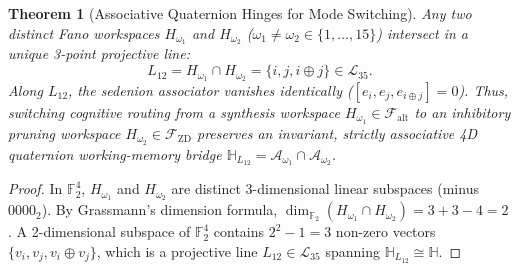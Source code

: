 \documentclass[11pt,a4paper]{article}
\newtheorem{theorem}{Theorem}[section]
\theoremstyle{definition}
\theoremstyle{remark}
\newcommand{\Ha}{\mathbb{H}}
\newcommand{\Ftwo}{\mathbb{F}_2}
\newcommand{\Falt}{\mathcal{F}_{\mathrm{alt}}}
\newcommand{\Fzd}{\mathcal{F}_{\mathrm{ZD}}}
\begin{document}
\begin{theorem}[Associative Quaternion Hinges for Mode Switching]
\label{thm:hinge}
Any two distinct Fano workspaces $H_{\omega_1}$ and $H_{\omega_2}$ ($\omega_1 \neq \omega_2 \in \{1, \dots, 15\}$) intersect in a unique 3-point projective line:
\begin{equation}
\label{eq:hinge}
L_{12} = H_{\omega_1} \cap H_{\omega_2} = \{i, j, i \oplus j\} \in \mathcal{L}_{35}.
\end{equation}
Along $L_{12}$, the sedenion associator vanishes identically ($[e_i, e_j, e_{i \oplus j}] = 0$). Thus, switching cognitive routing from a synthesis workspace $H_{\omega_1} \in \Falt$ to an inhibitory pruning workspace $H_{\omega_2} \in \Fzd$ preserves an invariant, strictly associative 4D quaternion working-memory bridge $\Ha_{L_{12}} = \mathcal{A}_{\omega_1} \cap \mathcal{A}_{\omega_2}$.
\end{theorem}
\begin{proof}
In $\Ftwo^4$, $H_{\omega_1}$ and $H_{\omega_2}$ are distinct 3-dimensional linear subspaces (minus $0000_2$). By Grassmann's dimension formula, $\dim_{\Ftwo}(H_{\omega_1} \cap H_{\omega_2}) = 3 + 3 - 4 = 2$. A 2-dimensional subspace of $\Ftwo^4$ contains $2^2 - 1 = 3$ non-zero vectors $\{v_i, v_j, v_i \oplus v_j\}$, which is a projective line $L_{12} \in \mathcal{L}_{35}$ spanning $\Ha_{L_{12}} \cong \Ha$.
\end{proof}
\end{document}
